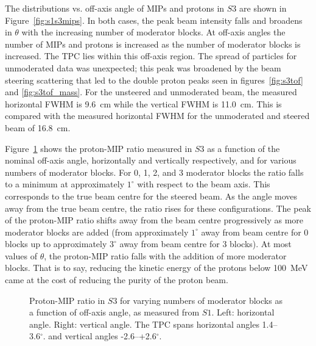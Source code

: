 The distributions vs. off-axis angle of MIPs and protons in $\mathit{S3}$ are shown in Figure~\ref{fig:s1s3mips}.
In both cases, the peak beam intensity falls and broadens in $\theta$ with the increasing number of moderator blocks. 
At off-axis angles the number of MIPs and protons is increased as the number of moderator blocks is increased.
The TPC lies within this off-axis region.
The spread of particles for unmoderated data was unexpected; this peak was broadened by the beam steering scattering that led to the double proton peaks seen in figures~\ref{fig:s3tof} and \ref{fig:s3tof_mass}.
For the unsteered and unmoderated beam, the measured horizontal FWHM is 9.6~cm while the vertical FWHM is 11.0~cm.
This is compared with the measured horizontal FWHM for the unmoderated and steered beam of 16.8~cm.

Figure~\ref{fig:propiratio_s3_horz} shows the proton-MIP ratio measured in $\mathit{S3}$ as a function of the nominal off-axis angle, horizontally and vertically respectively, and for various numbers of moderator blocks.
For 0, 1, 2, and 3 moderator blocks the ratio falls to a minimum at approximately $1^{\circ}$ with respect to the beam axis.
This corresponds to the true beam centre for the steered beam.
As the angle moves away from the true beam centre, the ratio rises for these configurations.
The peak of the proton-MIP ratio shifts away from the beam centre progressively as more moderator blocks are added (from approximately $1^{\circ}$ away from beam centre for 0 blocks up to approximately $3^{\circ}$ away from beam centre for 3 blocks).
At most values of $\theta$, the proton-MIP ratio falls with the addition of more moderator blocks. 
That is to say, reducing the kinetic energy of the protons below 100~MeV came at the cost of reducing the purity of the proton beam.

\begin{figure}[!ht]
  \begin{minipage}[t]{0.48\textwidth}
    \begin{adjustbox}{max totalsize={\textwidth}{.35\textheight}, center}
      
    \end{adjustbox}
    
  \end{minipage}
  \hspace{0.3cm}
  \begin{minipage}[t]{0.48\textwidth}
    \begin{adjustbox}{max totalsize={\textwidth}{.35\textheight}, center}
      
    \end{adjustbox}
  \end{minipage}	
  \caption{\label{fig:propiratio_s3_horz}Proton-MIP ratio in $\mathit{S3}$ for varying numbers of moderator blocks as a function of off-axis angle, as measured from $\mathit{S1}$.  Left: horizontal angle. Right: vertical angle. The TPC spans horizontal angles 1.4--3.6$^{ \circ }$. and vertical angles -2.6--+2.6$^{ \circ }$.}
\end{figure}

